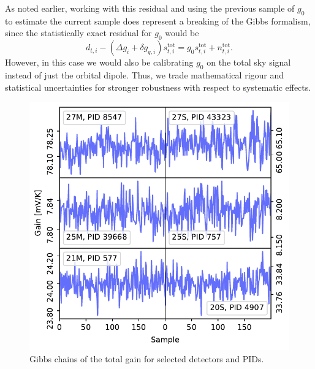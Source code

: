 \documentclass[twocolumn]{aa}
\newcommand{\ti}[0]{_{t, i}}
\newcommand{\qi}[0]{_{q, i}}
\newcommand{\tot}[0]{^{\mathrm{tot}}}
\begin{document}
As noted earlier, working with this residual and using the previous
sample of $g_0$ to estimate the current sample does represent a
breaking of the Gibbs formalism, since the statistically exact
residual for $g_0$ would be
\begin{equation}
    d\ti - (\Delta g_i + \delta g\qi)s\tot\ti = g_0 s\tot\ti + n\ti\tot.
\end{equation}
However, in this case we would also be calibrating $g_0$ on the total
sky signal instead of just the orbital dipole. Thus, we trade
mathematical rigour and statistical uncertainties for stronger
robustness with respect to systematic effects.

\begin{figure}
  \center
  \includegraphics[width=\linewidth]{figs/chains.pdf}
    \caption{Gibbs chains of the total gain for selected detectors and PIDs.}
  \label{fig:chains}
\end{figure}
\end{document}
